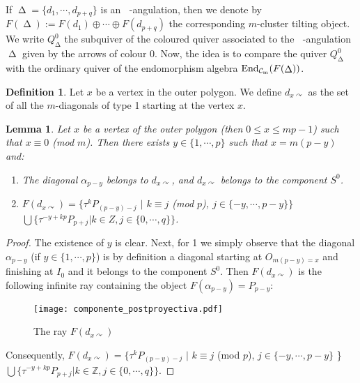 \documentclass{amsart}
\theoremstyle{plain}
\newtheorem{lema}[teo]{Lemma}
\theoremstyle{definition}
\newtheorem{defi}[teo]{Definition}
\begin{document}
If ${\mathop{\Delta}\nolimits}=\{d_1, \cdots, d_{p+q}\}$ is an  ${\mathop{(m+2)}\nolimits}$-angulation, then we denote by   $F({\mathop{\Delta}\nolimits}):=F(d_1)\oplus \cdots \oplus F(d_{p+q})$ the corresponding $m$-cluster tilting object.\\

We write $Q_{\mathop{\Delta}\nolimits}^0$ the  subquiver of the coloured quiver  associated to the ${\mathop{(m+2)}\nolimits}$-angulation ${\mathop{\Delta}\nolimits}$ given by the arrows of colour $0$. Now, the idea is to compare the  quiver $Q_{\mathop{\Delta}\nolimits}^0$  with the ordinary quiver of the endomorphism  algebra ${\mathop{\rm End_{\mathcal{C}_m}}\nolimits}(F({\mathop{\Delta}\nolimits}))$.\\

\begin{defi} Let $x$ be a vertex in the outer polygon. We define  $d_{x\curvearrowright}$ as the set of all the  $m$-diagonals of type 1 starting at the vertex  $x$.
\end{defi}

\begin{lema} Let $x$ be a vertex of the outer polygon (then $0\leq x\leq mp-1$) such that $x\equiv 0$ (mod $m$). Then there  exists $y\in \{1,\cdots,p\}$ such that $x=m(p-y)$ and:

\begin{enumerate}
  
  \item   The diagonal $\alpha_{p-y}$ belongs to  $d_{x\curvearrowright}$,
and   $d_{x\curvearrowright}$ belongs to the component $S^0$.

  \item   $F(d_{x\curvearrowright})=\{\tau ^kP_{(p-y)-j}$ $ |$ $k\equiv j$ (mod $p$), $j\in \{-y,\cdots,p-y\} \}$ $\bigcup \{ \tau^{-y+kp}P_{p+j} | k\in Z, j\in \{0, \cdots, q\}\} $.
\end{enumerate}

\end{lema}

\begin{proof}
The existence of  $y$ is clear. Next, for 1 we simply observe that the diagonal $\alpha_{p-y}$  (if $ y\in \{1,\cdots,p\}$) is by definition a  diagonal starting at  $O_{m(p-y)=x}$ and finishing at  $I_0$ and it belongs to the component   $S^0$. Then $F(d_{x\curvearrowright})$ is the following  infinite ray  containing the object  $F(\alpha_{p-y})=P_{p-y}$:

\begin{figure}[H]
\texttt{[image: componente\_postproyectiva.pdf]}
\vspace{-1cm}
\caption{The ray $F(d_{x\curvearrowright})$ } \label{rayo}
\end{figure}

Consequently, $F(d_{x\curvearrowright})=\{\tau ^kP_{(p-y)-j}$ $|$ $k\equiv j$ (mod $p$), $j\in \{-y,\cdots,p-y\}$ \} $\bigcup \{ \tau^{-y+kp}P_{p+j} $$|$$ k\in \mathbb{Z}, j\in \{0, \cdots, q\}\} $.
\end{proof}
\end{document}
